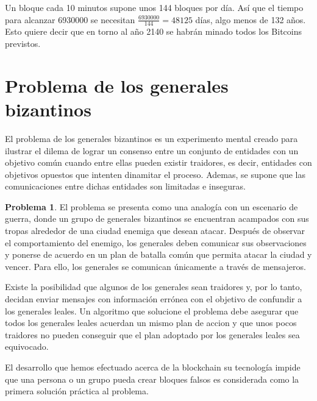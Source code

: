 \documentclass[twoside]{article}
\theoremstyle{definition}
\newtheorem{problem}[teorema]{Problema}
\begin{document}
Un bloque cada 10 minutos supone unos 144 bloques por día. Así que el tiempo para alcanzar 6930000 se necesitan $\frac{6930000}{144} = 48125$ días, algo menos de 132 años. Esto quiere decir que en torno al año 2140 se habrán minado todos los Bitcoins previstos.





\vspace{5cm}

\newpage
\section{Problema de los generales bizantinos}
El problema de los generales bizantinos es un experimento mental creado para ilustrar el dilema de lograr un consenso entre un conjunto de entidades con un objetivo común cuando entre ellas pueden existir traidores, es decir, entidades con objetivos opuestos que intenten dinamitar el proceso. Ademas, se supone que las comunicaciones entre dichas entidades son limitadas e inseguras. 
\begin{problem}
El problema se presenta como una analogía con un escenario de guerra, donde un grupo de generales bizantinos se encuentran acampados con sus tropas alrededor de una ciudad enemiga que desean atacar. Después de observar el comportamiento del enemigo, los generales deben comunicar sus observaciones y ponerse de acuerdo en un plan de batalla común que permita atacar la ciudad y vencer. Para ello, los generales se comunican únicamente a través de mensajeros. 

Existe la posibilidad que algunos de los generales sean traidores y, por lo tanto, decidan enviar mensajes con información errónea con el objetivo de confundir a los generales leales. Un algoritmo que solucione el problema debe asegurar que todos los generales leales acuerdan un mismo plan de accion y que unos pocos traidores no pueden conseguir que el plan adoptado por los generales leales sea equivocado.
\end{problem}
El desarrollo que hemos efectuado acerca de la blockchain su tecnología impide que una persona o un grupo pueda crear bloques falsos es considerada como la primera solución práctica al problema. 

\newpage 
\end{document}
